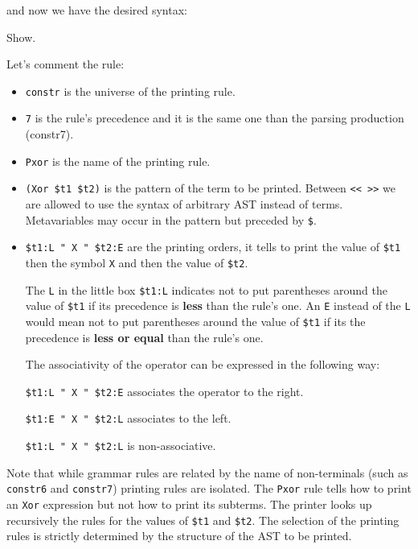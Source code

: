 {and now we have the desired syntax:

\begin{coq_example}
Show.
\end{coq_example}

Let's comment the rule:
\begin{itemize}
\item \verb+constr+ is the universe of the printing rule.

\item \verb+7+ is the rule's precedence and it is the same one than the
  parsing production (constr7).

\item \verb+Pxor+ is the name of the printing rule.

\item \verb+(Xor $t1 $t2)+ is the pattern of the term to be
printed. Between \verb+<< >>+ we are allowed to use the syntax of
arbitrary AST instead of terms. Metavariables may occur in the pattern
but preceded by \verb+$+.

\item \verb+$t1:L " X " $t2:E+ are the printing
  orders, it tells to print the value of \verb+$t1+ then the symbol
  \verb+X+ and then the value of \verb+$t2+.

  The \verb+L+ in the little box \verb+$t1:L+ indicates not
  to put parentheses around the value of \verb+$t1+ if its precedence
  is {\bf less} than the rule's one. An \verb+E+ instead of the
  \verb+L+ would mean not to put parentheses around the value of
  \verb+$t1+ if its the precedence is {\bf less or equal} than the
  rule's one.

  The associativity of the operator can be expressed in the following
  way:

  \verb&$t1:L " X " $t2:E& associates the operator to the right.

  \verb&$t1:E " X " $t2:L& associates to the left.

  \verb&$t1:L " X " $t2:L& is non-associative.

\end{itemize}

Note that while grammar rules are related by the name of non-terminals
(such as {\tt constr6} and {\tt constr7}) printing rules are
isolated. The {\tt Pxor} rule tells how to print an {\tt Xor}
expression but not how to print its subterms.  The printer looks up
recursively the rules for the values of \verb+$t1+ and \verb+$t2+. The
selection of the printing rules is strictly determined by the
structure of the AST to be printed.

}

